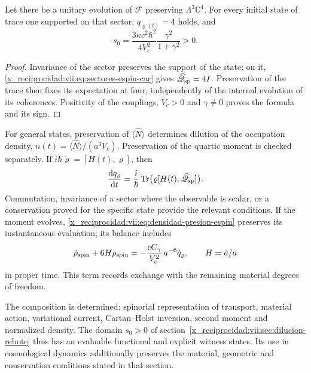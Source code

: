 \begin{corollary}
\label{x_reciprocidad:vii:cor:dominio-positivo-conservado}
Let there be a unitary evolution of \(\mathcal F\) preserving
\(\Lambda^3\mathbb C^4\). For every initial state of trace one
supported on that sector, \(q_{\varrho(t)}=4\) holds, and
\begin{equation}
 s_0=\frac{3\kappa c^2\hbar^2}{4V_c^2}
                   \frac{\gamma^2}{1+\gamma^2}>0.
 \label{x_reciprocidad:vii:eq:amplitud-positiva-sector-tres}
\end{equation}
\end{corollary}
\begin{proof}
Invariance of the sector preserves the support of the state; on it,
\eqref{x_reciprocidad:vii:eq:sectores-espin-car} gives
\(\widehat{\mathscr Q}_{\rm sp}=4I\). Preservation of the
trace then fixes its expectation at four, independently of
the internal evolution of its coherences. Positivity of the
couplings, \(V_c>0\) and \(\gamma\ne0\) proves the formula
and its sign.
\end{proof}

For general states, preservation of
\(\langle\widehat N\rangle\) determines dilution of the occupation
density, \(n(t)=\langle\widehat N\rangle/(a^3V_c)\).
Preservation of the quartic moment is checked separately.
If \(i\hbar\dot\varrho=[H(t),\varrho]\), then
\begin{equation}
 \frac{\mathrm d q_\varrho}{\mathrm dt}
 =\frac{i}{\hbar}\operatorname{Tr}
       \bigl(\varrho[H(t),\widehat{\mathscr Q}_{\rm sp}]\bigr).
 \label{x_reciprocidad:vii:eq:conservacion-momento-cuartico}
\end{equation}
Commutation, invariance of a sector where the observable is
scalar, or a conservation proved for the specific state
provide the relevant conditions. If the moment evolves,
\eqref{x_reciprocidad:vii:eq:densidad-presion-espin} preserves its instantaneous
evaluation; its balance includes
\[
 \dot\rho_{\rm spin}+6H\rho_{\rm spin}
 =-\frac{cC_\gamma}{V_c^2}\,a^{-6}\dot q_\varrho,
 \qquad H=\dot a/a
\]
in proper time. This term records exchange with the
remaining material degrees of freedom.

The composition is determined: spinorial representation of
transport, material action, variational current, Cartan--Holst
inversion, second moment and normalized density. The domain
\(s_0>0\) of section~\ref{x_reciprocidad:vii:sec:dilucion-rebote} thus has
an evaluable functional and explicit witness states. Its use in
cosmological dynamics additionally preserves the material,
geometric and conservation conditions stated in that section.

